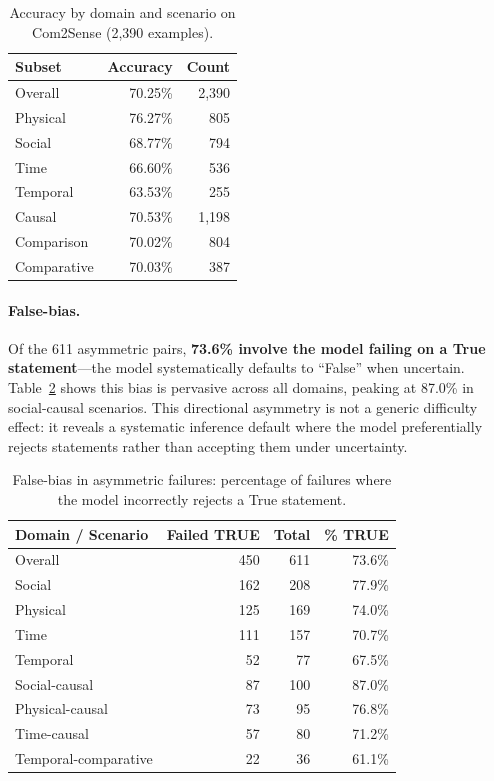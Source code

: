 \documentclass{article}
\begin{document}
\begin{table}[t]
\centering
\small
\caption{Accuracy by domain and scenario on Com2Sense (2,390 examples).}
\label{tab:accuracy}
\begin{tabular}{lrr}
\toprule
\textbf{Subset} & \textbf{Accuracy} & \textbf{Count} \\
\midrule
Overall & 70.25\% & 2,390 \\
\midrule
Physical & 76.27\% & 805 \\
Social & 68.77\% & 794 \\
Time & 66.60\% & 536 \\
Temporal & 63.53\% & 255 \\
\midrule
Causal & 70.53\% & 1,198 \\
Comparison & 70.02\% & 804 \\
Comparative & 70.03\% & 387 \\
\bottomrule
\end{tabular}
\end{table}

\paragraph{False-bias.}
Of the 611 asymmetric pairs, \textbf{73.6\% involve the model failing on a True statement}---the model systematically defaults to ``False'' when uncertain.
Table~\ref{tab:false_bias} shows this bias is pervasive across all domains, peaking at 87.0\% in social-causal scenarios.
This directional asymmetry is not a generic difficulty effect: it reveals a systematic inference default where the model preferentially rejects statements rather than accepting them under uncertainty.

\begin{table}[t]
\centering
\small
\caption{False-bias in asymmetric failures: percentage of failures where the model incorrectly rejects a True statement.}
\label{tab:false_bias}
\begin{tabular}{lrrr}
\toprule
\textbf{Domain / Scenario} & \textbf{Failed TRUE} & \textbf{Total} & \textbf{\% TRUE} \\
\midrule
Overall & 450 & 611 & 73.6\% \\
\midrule
Social & 162 & 208 & 77.9\% \\
Physical & 125 & 169 & 74.0\% \\
Time & 111 & 157 & 70.7\% \\
Temporal & 52 & 77 & 67.5\% \\
\midrule
Social-causal & 87 & 100 & 87.0\% \\
Physical-causal & 73 & 95 & 76.8\% \\
Time-causal & 57 & 80 & 71.2\% \\
Temporal-comparative & 22 & 36 & 61.1\% \\
\bottomrule
\end{tabular}
\end{table}
\end{document}
